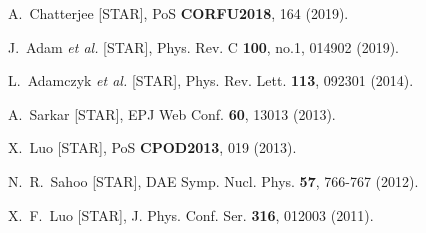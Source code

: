 \begin{thebibliography}{99}
A.~Chatterjee [STAR],
PoS \textbf{CORFU2018}, 164 (2019).

J.~Adam \textit{et al.} [STAR],
Phys. Rev. C \textbf{100}, no.1, 014902 (2019).

L.~Adamczyk \textit{et al.} [STAR],
Phys. Rev. Lett. \textbf{113}, 092301 (2014).

A.~Sarkar [STAR],
EPJ Web Conf. \textbf{60}, 13013 (2013).

X.~Luo [STAR],
PoS \textbf{CPOD2013}, 019 (2013).

N.~R.~Sahoo [STAR],
DAE Symp. Nucl. Phys. \textbf{57}, 766-767 (2012).

X.~F.~Luo [STAR],
J. Phys. Conf. Ser. \textbf{316}, 012003 (2011).


\end{thebibliography}
